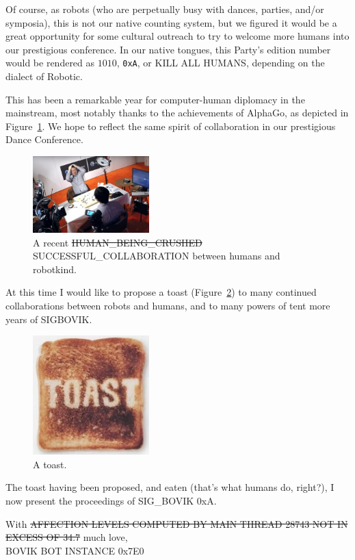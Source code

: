 \documentclass[12pt]{article}
\begin{document}
Of course, as robots (who are perpetually busy with dances, parties, and/or symposia),
this is not our native counting system, but we figured it would be a great opportunity for some cultural outreach
to try to welcome more humans into our prestigious conference.
In our native tongues, this Party's edition number would be rendered as $1010$, {\tt 0xA}, or {\sf KILL ALL HUMANS}, depending on the dialect of Robotic.

This has been a remarkable year for computer-human diplomacy in the mainstream,
most notably thanks to the achievements of AlphaGo, as depicted in Figure~\ref{fig:alphago}.
We hope to reflect the same spirit of collaboration in our prestigious Dance Conference.

\begin{figure}[h]
	\centering
	\includegraphics[width=0.4\textwidth]{fanhui.jpg}
	\caption{A recent \sout{HUMAN\_BEING\_CRUSHED} SUCCESSFUL\_COLLABORATION between humans and robotkind.}
	\label{fig:alphago}
\end{figure}

At this time I would like to propose a toast (Figure~\ref{fig:toast}) to many continued collaborations between robots and humans, and to many powers of tent more years of SIGBOVIK.

\begin{figure}[h]
	\centering
	\includegraphics[width=0.4\textwidth]{toast.jpg}
	\caption{A toast.}
	\label{fig:toast}
\end{figure}

The toast having been proposed, and eaten (that's what humans do, right?), I now present the proceedings of {SIG\_BOVIK 0xA}.

With \sout{AFFECTION LEVELS COMPUTED BY MAIN THREAD 28743 NOT IN EXCESS OF 34.7} much love, \\
BOVIK BOT INSTANCE 0x7E0
\end{document}
